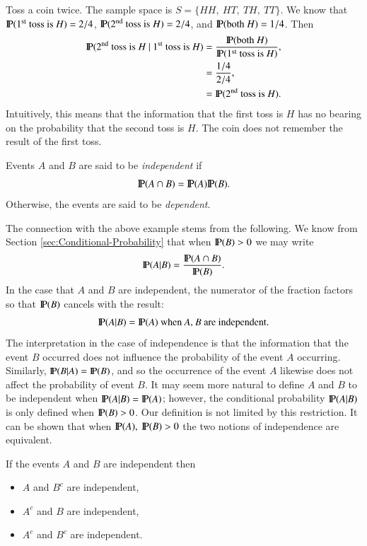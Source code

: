 \documentclass[captions=tableheading]{scrbook}
\begin{document}
Toss a coin twice. The sample space is \(S= \{ HH,\ HT,\ TH,\ TT \} \). We know that \(\P(1^{\mathrm{st}}\mbox{ toss is }H)=2/4\), \(\P(2^{\mathrm{nd}}\mbox{ toss is }H)=2/4\), and \(\P(\mbox{both }H)=1/4\). Then
\begin{align*} \P(2^{\mathrm{nd}}\mbox{ toss is }H\ |\ 1^{\mathrm{st}}\mbox{ toss is }H) & =\frac{\P(\mbox{both }H)}{\P(1^{\mathrm{st}}\mbox{ toss is }H)},\\
 & =\frac{1/4}{2/4},\\
 & =\P(2^{\mathrm{nd}}\mbox{ toss is }H).
\end{align*}
Intuitively, this means that the information that the first toss is \(H\) has no bearing on the probability that the second toss is \(H\). The coin does not remember the result of the first toss. 

\begin{defn}
Events \(A\) and \(B\) are said to be \emph{independent} if 
\begin{equation}
\P(A\cap B)=\P(A)\P(B).
\end{equation}
Otherwise, the events are said to be \emph{dependent}. 
\end{defn}

The connection with the above example stems from the following. We know from Section \ref{sec:Conditional-Probability} that when \(\P(B)>0\) we may write
\begin{equation}
\P(A|B)=\frac{\P(A\cap B)}{\P(B)}.
\end{equation}
In the case that \(A\) and \(B\) are independent, the numerator of the fraction factors so that \(\P(B)\) cancels with the result:
\begin{equation}
\P(A|B)=\P(A)\mbox{ when \mbox{\emph{A},\emph{ B}} are independent.}
\end{equation}
The interpretation in the case of independence is that the information that the event \(B\) occurred does not influence the probability of the event \(A\) occurring. Similarly, \(\P(B|A)=\P(B)\), and so the occurrence of the event \(A\) likewise does not affect the probability of event \(B\). It may seem more natural to define \(A\) and \(B\) to be independent when \(\P(A|B)=\P(A)\); however, the conditional probability \(\P(A|B)\) is only defined when \(\P(B)>0\). Our definition is not limited by this restriction. It can be shown that when \(\P(A),\ \P(B)>0\) the two notions of independence are equivalent.

\begin{prop}
If the events \(A\) and \(B\) are independent then
\begin{itemize}
\item \(A\) and \(B^{c}\) are independent,
\item \(A^{c}\) and \(B\) are independent,
\item \(A^{c}\) and \(B^{c}\) are independent.
\end{itemize}

\end{prop}
\end{document}
